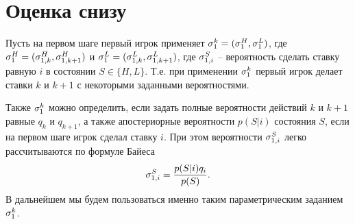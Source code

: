 \section{Оценка снизу}
\label{sec:lower_bound}

Пусть на первом шаге первый игрок применяет 
$ \sigma^k_1 = (\sigma^H_1, \sigma^L_1) $, где 
$ \sigma^H_1 = (\sigma^H_{1,k}, \sigma^H_{1,k+1}) $ и 
$ \sigma^L_1 = (\sigma^L_{1,k}, \sigma^L_{1,k+1}) $, где 
$ \sigma^S_{1,i} $ -- вероятность сделать ставку равную $ i $ в состоянии $ S \in \{ H, L \} $.
Т.е. при применении $ \sigma^k_1 $ первый игрок делает ставки $ k $ и $ k + 1 $ с некоторыми заданными вероятностями. 

Также $ \sigma^k_1 $ можно определить, если задать полные вероятности действий $ k $ и $ k + 1 $ равные $ q_k $ и $ q_{k+1} $, а также апостериорные вероятности $ p(S|i) $ состояния $ S $, если на первом шаге игрок сделал ставку $ i $. 
При этом вероятности $ \sigma^S_{1,i} $ легко рассчитываются по формуле Байеса
\[
    \sigma^S_{1,i} = \frac{p(S|i)q_i}{p(S)}.
\]
В дальнейшем мы будем пользоваться именно таким параметрическим заданием $ \sigma^k_1 $.

